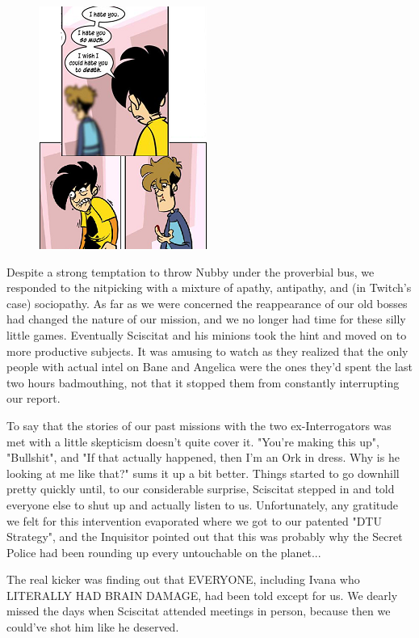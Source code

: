 \begin{figure}
	\begin{center}
		\includegraphics[width=\figwidth]{pics/19/11.png}
	\end{center}
\end{figure}
Despite a strong temptation to throw Nubby under the proverbial bus, we responded to the nitpicking with a mixture of apathy, antipathy, and (in Twitch's case) sociopathy. 
As far as we were concerned the reappearance of our old bosses had changed the nature of our mission, and we no longer had time for these silly little games. 
Eventually Sciscitat and his minions took the hint and moved on to more productive subjects. 
It was amusing to watch as they realized that the only people with actual intel on Bane and Angelica were the ones they'd spent the last two hours badmouthing, not that it stopped them from constantly interrupting our report. 


To say that the stories of our past missions with the two ex-Interrogators was met with a little skepticism doesn't quite cover it. 
"You're making this up", "Bullshit", and "If that actually happened, then I'm an Ork in dress. 
Why is he looking at me like that?" sums it up a bit better. 
Things started to go downhill pretty quickly until, to our considerable surprise, Sciscitat stepped in and told everyone else to shut up and actually listen to us. 
Unfortunately, any gratitude we felt for this intervention evaporated where we got to our patented "DTU Strategy", and the Inquisitor pointed out that this was probably why the Secret Police had been rounding up every untouchable on the planet... 


The real kicker was finding out that EVERYONE, including Ivana who LITERALLY HAD BRAIN DAMAGE, had been told except for us. 
We dearly missed the days when Sciscitat attended meetings in person, because then we could've shot him like he deserved.

